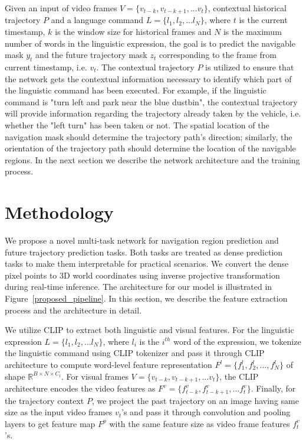 \documentclass[11pt]{article}
\begin{document}
Given an input of video frames $V=\{v_{t-k}, v_{t-k+1}, ... v_{t}\}$, contextual historical trajectory $P$ and a language command $L = \{l_1, l_2, ...l_N\}$, where $t$ is the current timestamp, $k$ is the window size for historical frames and $N$ is the maximum number of words in the linguistic expression, the goal is to predict the navigable mask $y_t$ and the future trajectory mask $z_t$ corresponding to the frame from current timestamp, i.e. $v_t$. The contextual trajectory $P$ is utilized to ensure that the network gets the contextual information necessary to identify which part of the linguistic command has been executed. For example, if the linguistic command is "turn left and park near the blue dustbin", the contextual trajectory will provide information regarding the trajectory already taken by the vehicle, i.e. whether the "left turn" has been taken or not. The spatial location of the navigation mask should determine the trajectory path's direction; similarly, the orientation of the trajectory path should determine the location of the navigable regions. In the next section we describe the network architecture and the training process.

\section{Methodology}

We propose a novel multi-task network for navigation region prediction and future trajectory prediction tasks. Both tasks are treated as dense prediction tasks to make them interpretable for practical scenarios. We convert the dense pixel points to 3D world coordinates using inverse projective transformation during real-time inference. The architecture for our model is illustrated in Figure~\ref{proposed_pipeline}. In this section, we  describe the feature extraction process and the architecture in detail.

We utilize CLIP \cite{Radford2021LearningTV} to extract both linguistic and visual features. For the linguistic expression $L = \{l_1, l_2, ...l_N\}$, where $l_i$ is the $i^{th}$ word of the expression, we tokenize the linguistic command using CLIP tokenizer and pass it through CLIP architecture to compute word-level feature representation $F^l = \{f^{l}_{1}, f^{l}_{2}, ..., f^{l}_{N}\}$ of shape $\mathbb R^{B \times N \times C_l}$. For visual frames $V=\{v_{t-k}, v_{t-k+1}, ... v_{t}\}$, the CLIP architecture encodes the video features as $F^v=\{f^{v}_{t-k}, f^{v}_{t-k+1}, ... f^{v}_{t}\}$. Finally, for the trajectory context $P$, we project the past trajectory on an image having same size as the input video frames $v_t$'s and pass it through convolution and pooling layers to get feature map $F^p$ with the same feature size as video frame features $f^{v}_{t}$'s.
\end{document}
